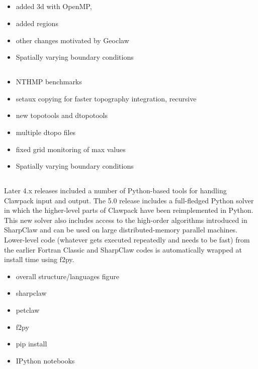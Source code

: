 \documentclass[]{siamltex}
\begin{document}
\subsection{\amrclaw}
\begin{itemize}
    \item added 3d with OpenMP, 
    \item added regions
    \item other changes motivated by Geoclaw
    \item Spatially varying boundary conditions
\end{itemize}

\subsection{\geoclaw}
\begin{itemize}
    \item NTHMP benchmarks
    \item setaux copying for faster topography integration, recursive 
    \item new topotools and dtopotools
    \item multiple dtopo files
    \item fixed grid monitoring of max values
    \item Spatially varying boundary conditions
\end{itemize}
    
\subsection{\pyclaw}

Later 4.x releases included a number of Python-based tools for handling Clawpack input and output.  The 5.0 release includes a full-fledged Python solver in which the higher-level parts of Clawpack have been reimplemented in Python.  This new solver also includes access to the high-order algorithms introduced in SharpClaw and can be used on large distributed-memory parallel machines.  Lower-level code (whatever gets executed repeatedly and needs to be fast) from the earlier Fortran Classic and SharpClaw codes is automatically wrapped at install time using f2py.

\begin{itemize}
    \item overall structure/languages figure
    \item sharpclaw
    \item petclaw
    \item f2py
    \item pip install
    \item IPython notebooks
\end{itemize}
    
\end{document}
